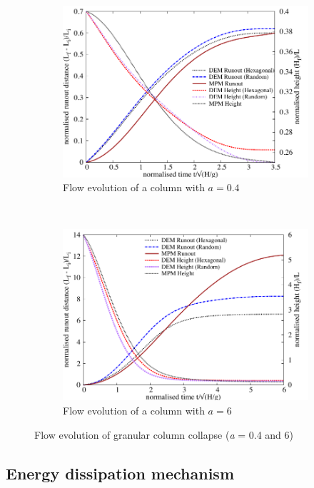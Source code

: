 \begin{figure}[tbhp]
\centering
\begin{subfigure}[b]{0.975\textwidth}
\centering
\includegraphics[width=\textwidth]{flowa04}
\caption{Flow evolution of a column with $a=0.4$}
\label{fig:flowa04}
\end{subfigure}
\\
\begin{subfigure}[b]{0.975\textwidth}
\centering
\includegraphics[width=\textwidth]{flowa6}
\caption{Flow evolution of a column with $a=6$}
\label{fig:flowa6}
\end{subfigure}
\caption{Flow evolution of granular column collapse (\textit{a} = 0.4 and 6)}
\label{fig:flow_column}
\end{figure}

\subsection{Energy dissipation mechanism}
\label{sec:energy}

